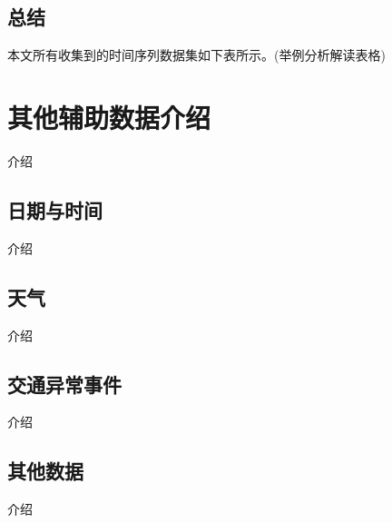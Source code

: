 \documentclass{ctexart}
\begin{document}
\subsection{总结}
本文所有收集到的时间序列数据集如下表所示。(举例分析解读表格)



\section{其他辅助数据介绍}
介绍

\subsection{日期与时间}
介绍

\subsection{天气}
介绍

\subsection{交通异常事件}
介绍

\subsection{其他数据}
介绍



\end{document}
